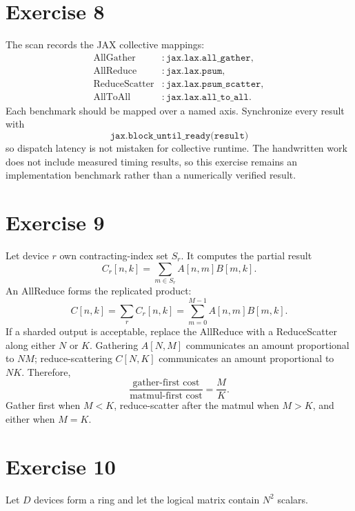 \documentclass[11pt]{article}
\newcommand{\AG}{\operatorname{AllGather}}
\newcommand{\AR}{\operatorname{AllReduce}}
\newcommand{\RS}{\operatorname{ReduceScatter}}
\newcommand{\ATA}{\operatorname{AllToAll}}
\begin{document}
\section*{Exercise 8}

The scan records the JAX collective mappings:
\begin{align*}
\AG &: \texttt{jax.lax.all\_gather},\\
\AR &: \texttt{jax.lax.psum},\\
\RS &: \texttt{jax.lax.psum\_scatter},\\
\ATA &: \texttt{jax.lax.all\_to\_all}.
\end{align*}
Each benchmark should be mapped over a named axis. Synchronize every result
with
\[
\texttt{jax.block\_until\_ready(result)}
\]
so dispatch latency is not mistaken for collective runtime. The handwritten
work does not include measured timing results, so this exercise remains an
implementation benchmark rather than a numerically verified result.

\section*{Exercise 9}

Let device $r$ own contracting-index set $S_r$. It computes the partial result
\[
C_r[n,k]=\sum_{m\in S_r}A[n,m]B[m,k].
\]
An AllReduce forms the replicated product:
\[
C[n,k]=\sum_r C_r[n,k]
=\sum_{m=0}^{M-1}A[n,m]B[m,k].
\]
If a sharded output is acceptable, replace the AllReduce with a ReduceScatter
along either $N$ or $K$. Gathering $A[N,M]$ communicates an amount proportional
to $NM$; reduce-scattering $C[N,K]$ communicates an amount proportional to
$NK$. Therefore,
\[
\frac{\text{gather-first cost}}{\text{matmul-first cost}}=\boxed{\frac{M}{K}}.
\]
Gather first when $M<K$, reduce-scatter after the matmul when $M>K$, and either
when $M=K$.

\section*{Exercise 10}

Let $D$ devices form a ring and let the logical matrix contain $N^2$ scalars.
\end{document}
